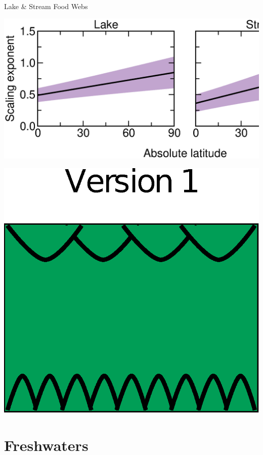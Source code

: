 \documentclass{beamer}
\begin{document}
  \begin{frame}{Lake \& Stream Food Webs}
    \begin{center}
      \includegraphics*[width=.75\textwidth]{Figures/results/effect.eps}

    \vspace{1.02cm}

    \includegraphics*[width=.255\textwidth]{Figures/version1.eps}

    \end{center}
  \end{frame}


\section*{Freshwaters}
\end{document}
